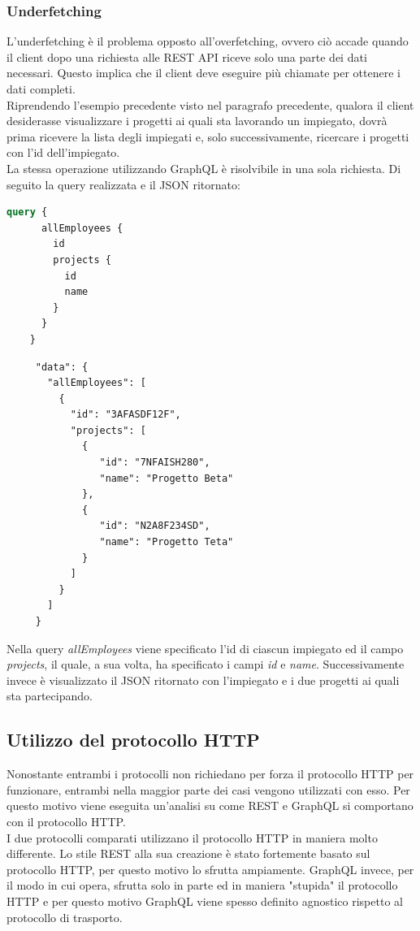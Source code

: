 \subsubsection*{Underfetching}
L'underfetching è il problema opposto all'overfetching, ovvero ciò accade quando il client dopo una richiesta alle REST API riceve solo una parte dei dati necessari. Questo implica che il client deve eseguire più chiamate per ottenere i dati completi.\\
Riprendendo l'esempio precedente visto nel paragrafo precedente, qualora il client desiderasse visualizzare i progetti ai quali sta lavorando un impiegato, dovrà prima ricevere la lista degli impiegati e, solo successivamente, ricercare i progetti con l'id dell'impiegato.\\
La stessa operazione utilizzando GraphQL è risolvibile in una sola richiesta. Di seguito la query realizzata e il JSON ritornato:
\begin{lstlisting}[language=GraphQL]
    query {
      allEmployees {
        id
        projects {
          id
          name
        }
      }
    }
\end{lstlisting}
\begin{lstlisting}
     "data": {
       "allEmployees": [
         {
           "id": "3AFASDF12F",
           "projects": [
             {
                "id": "7NFAISH280",
                "name": "Progetto Beta"
             },
             {
                "id": "N2A8F234SD",
                "name": "Progetto Teta"
             }
           ]
         }
       ]
     }
\end{lstlisting}
Nella query \textit{allEmployees} viene specificato l'id di ciascun impiegato ed il campo \textit{projects}, il quale, a sua volta, ha specificato i campi \textit{id} e \textit{name}. Successivamente invece è visualizzato il JSON ritornato con l'impiegato e i due progetti ai quali sta partecipando.
\subsection{Utilizzo del protocollo HTTP}
Nonostante entrambi i protocolli non richiedano per forza il protocollo HTTP per funzionare, entrambi nella maggior parte dei casi vengono utilizzati con esso. Per questo motivo viene eseguita un'analisi su come REST e GraphQL si comportano con il protocollo HTTP. \\
I due protocolli comparati utilizzano il protocollo HTTP in maniera molto differente. Lo stile REST alla sua creazione è stato fortemente basato sul protocollo HTTP, per questo motivo lo sfrutta ampiamente. GraphQL invece, per il modo in cui opera, sfrutta solo in parte ed in maniera "stupida" il protocollo HTTP e per questo motivo GraphQL viene spesso definito agnostico rispetto al protocollo di trasporto.
